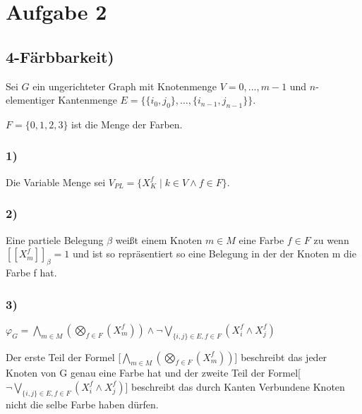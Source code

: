 \section*{Aufgabe 2}

\subsection*{4-Färbbarkeit)}

Sei $G$ ein ungerichteter Graph mit Knotenmenge $V = {0,...,m-1}$ und $n$-elementiger Kantenmenge $E = \lbrace \lbrace i_0,j_0\rbrace, \ldots , \lbrace i_{n-1} , j_{n-1} \rbrace \rbrace$.

$F = \lbrace 0,1,2,3 \rbrace$ ist die Menge der Farben.

\subsubsection*{1)}

Die Variable Menge sei $V_{PL}  = \lbrace X_K^f \mid k \in V \wedge f \in F \rbrace$.

\subsubsection*{2)}

Eine partiele Belegung $\beta$ weißt einem Knoten $m \in M$ eine Farbe $f \in F$ zu wenn $[\![X_m^f]\!]_\beta = 1$ und ist so repräsentiert so eine Belegung in der der Knoten m die Farbe f hat.

\subsubsection*{3)}

$\varphi_G = \bigwedge\limits_{m \in M} (\bigotimes\limits_{f \in F} (X_m^f) )
\wedge
\neg \bigvee\limits_{\lbrace i,j \rbrace \in E, f \in F} (X_i^f \wedge X_j^f)$

Der erste Teil der Formel [$\bigwedge\limits_{m \in M} (\bigotimes\limits_{f \in F} (X_m^f) )$] beschreibt das jeder Knoten von G genau eine Farbe hat und der zweite Teil der Formel[$\neg \bigvee\limits_{\lbrace i,j \rbrace \in E, f \in F} (X_i^f \wedge X_j^f)$] beschreibt das durch Kanten Verbundene Knoten nicht die selbe Farbe haben dürfen.


